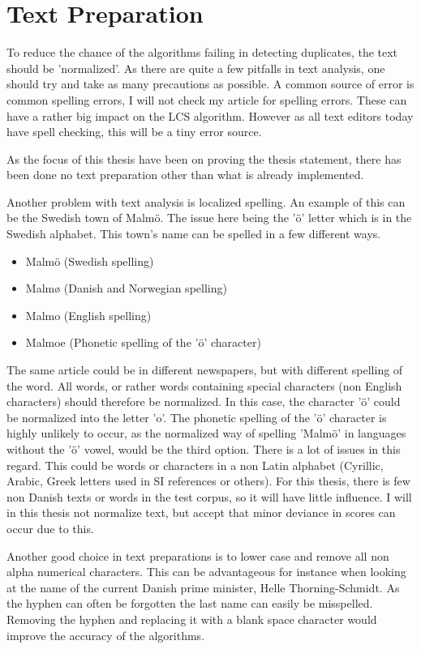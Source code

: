 \section{Text Preparation}
To reduce the chance of the algorithms failing in detecting duplicates, the text should be 'normalized'. As there are quite a few pitfalls in text analysis, one should try and take as many precautions as possible. A common source of error is common spelling errors, I will not check my article for spelling errors. These can have a rather big impact on the LCS algorithm. However as all text editors today have spell checking, this will be a tiny error source.

As the focus of this thesis have been on proving the thesis statement, there has been done no text preparation other than what is already implemented.

Another problem with text analysis is localized spelling. An example of this can be the Swedish town of Malmö. The issue here being the 'ö' letter which is in the Swedish alphabet. This town's name can be spelled in a few different ways.


\begin{itemize}
\item Malmö (Swedish spelling)
\item Malmø (Danish and Norwegian spelling)
\item Malmo (English spelling)
\item Malmoe (Phonetic spelling of the 'ö' character)
\end{itemize}

The same article could be in different newspapers, but with different spelling of the word. All words, or rather words containing special characters (non English characters) should therefore be normalized. In this case, the character 'ö' could be normalized into the letter 'o'. The phonetic spelling of the 'ö' character is highly unlikely to occur, as the normalized way of spelling 'Malmö' in languages without the 'ö' vowel, would be the third option. There is a lot of issues in this regard. This could be words or characters in a non Latin alphabet (Cyrillic, Arabic, Greek letters used in SI references or others). For this thesis, there is few non Danish texts or words in the test corpus, so it will have little influence. I will in this thesis not normalize text, but accept that minor deviance in scores can occur due to this.

Another good choice in text preparations is to lower case and remove all non alpha numerical characters. This can be advantageous for instance when looking at the name of the current Danish prime minister, Helle Thorning-Schmidt. As the hyphen can often be forgotten the last name can easily be misspelled. Removing the hyphen and replacing it with a blank space character would improve the accuracy of the algorithms. 

